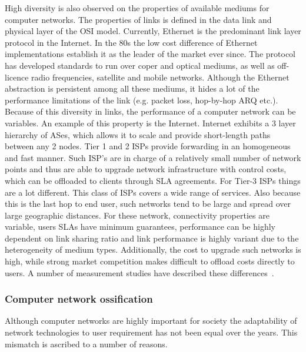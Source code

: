 High diversity is also observed on the properties of available mediums for
computer networks. The properties of links is defined in the data link and
physical layer of the OSI model. Currently, Ethernet is the predominant link
layer protocol in the Internet. In the 80s the low cost difference of Ethernet
implementations establish it as the leader of the market ever since.  The
protocol has developed standards to run over coper and optical mediums, as well
as off-licence radio frequencies, satellite and mobile networks. Although the
Ethernet abstraction is persistent among all these mediums, it hides a lot of
the performance limitations of the link (e.g. packet loss, hop-by-hop ARQ etc.).
Because of this diversity in links, the performance of a computer network can be
variables. An example of this property is the Internet. Internet exhibits a 3
layer hierarchy of ASes, which allows it to scale and provide short-length paths
between any 2 nodes.  Tier 1 and 2 ISPs provide forwarding in an homogeneous and
fast manner. Such ISP's are in charge of a relatively small number of network
points and thus are able to upgrade network infrastructure with control costs,
which can be offloaded to clients through SLA agreements. For Tier-3 ISPs things
are a lot different. This class of ISPs covers a wide range of services. Also
because this is the last hop to end user, such networks tend to be large and
spread over large geographic distances. For these network, connectivity
properties are variable, users SLAs have minimum guarantees, performance can be
highly dependent on link sharing ratio and link performance is highly variant
due to the heterogeneity of medium types. Additionally, the cost to upgrade such
networks is high, while strong market competition makes difficult to offload
costs directly to users. A number of measurement studies have
described these differences~\cite{Huang:2010wb,Dischinger:2007bg}. 

\subsubsection{Computer network ossification}

Although computer networks are highly important for society the adaptability of
network technologies to user requirement has not been equal over the years. This
mismatch is ascribed to a number of reasons. 


